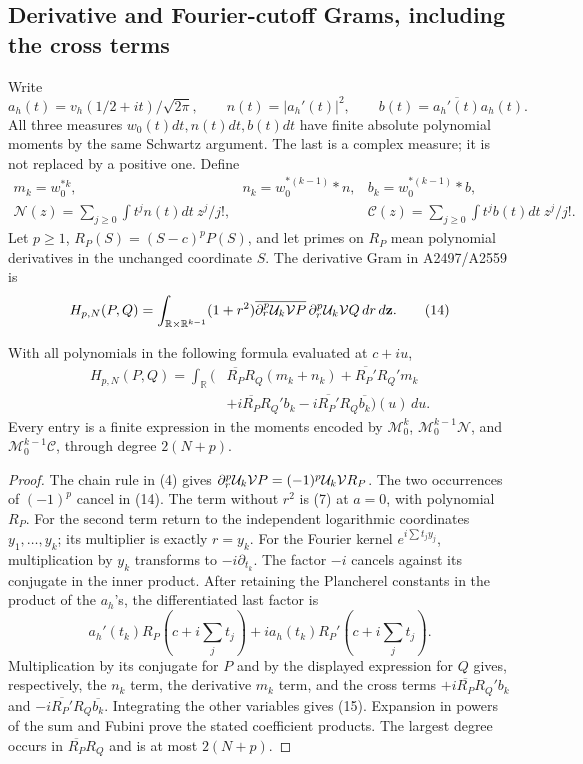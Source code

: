 \subsection{Derivative and Fourier-cutoff Grams, including the cross terms}
Write
\[
 a_h(t)=v_h(1/2+it)/\sqrt{2\pi},\qquad
 n(t)=|a_h'(t)|^2,\qquad
 b(t)=\overline{a_h'(t)}a_h(t).
 \tag{12}
\]
All three measures \(w_0(t)dt,n(t)dt,b(t)dt\) have finite absolute
polynomial moments by the same Schwartz argument. The last is a
complex measure; it is not replaced by a positive one. Define
\[
 \begin{array}{lll}
 m_k=w_0^{*k},&n_k=w_0^{*(k-1)}*n,&b_k=w_0^{*(k-1)}*b,\\
 \mathcal N(z)=\sum_{j\ge0}\int t^jn(t)dt\ z^j/j!,&&
 \mathcal C(z)=\sum_{j\ge0}\int t^jb(t)dt\ z^j/j!.
 \end{array}
 \tag{13}
\]
Let \(p\ge1\), \(R_P(S)=(S-c)^pP(S)\), and let primes on
\(R_P\) mean polynomial derivatives in the unchanged coordinate
\(S\). The derivative Gram in A2497/A2559 is
\[
 H_{p,N}(P,Q)=\int_{\mathbb R\times\mathbb R^{k-1}}
 (1+r^2)\overline{\partial_r^p\mathcal U_k\mathcal V P}\,
                    \partial_r^p\mathcal U_k\mathcal V Q\,dr\,d\mathbf z.
 \tag{14}
\]
\begin{latecontroltheorem}
With all polynomials in the following formula evaluated at \(c+iu\),
\[
 \begin{split}
 H_{p,N}(P,Q)=\int_{\mathbb R}\bigl(&
 \overline{R_P}R_Q(m_k+n_k)
 +\overline{R_P'}R_Q'm_k\\
 &+i\overline{R_P}R_Q'b_k
 -i\overline{R_P'}R_Q\overline{b_k}\bigr)(u)\,du.
 \end{split}
 \tag{15}
\]
Every entry is a finite expression in the moments encoded by
\(\mathcal M_0^k\), \(\mathcal M_0^{k-1}\mathcal N\), and
\(\mathcal M_0^{k-1}\mathcal C\), through degree \(2(N+p)\).
\end{latecontroltheorem}
\begin{proof}
The chain rule in (4) gives
\(\partial_r^p\mathcal U_k\mathcal V P=(-1)^p\mathcal U_k\mathcal V R_P\).
The two occurrences of \((-1)^p\) cancel in (14). The term without
\(r^2\) is (7) at \(a=0\), with polynomial \(R_P\).
For the second term return to the independent logarithmic coordinates
\(y_1,\ldots,y_k\); its multiplier is exactly \(r=y_k\).
For the Fourier kernel \(e^{i\sum t_jy_j}\), multiplication by
\(y_k\) transforms to \(-i\partial_{t_k}\). The factor \(-i\)
cancels against its conjugate in the inner product. After retaining
the Plancherel constants in the product of the \(a_h\)'s, the
differentiated last factor is
\[
 a_h'(t_k)R_P(c+i\textstyle\sum_jt_j)
 +i a_h(t_k)R_P'(c+i\textstyle\sum_jt_j).
\]
Multiplication by its conjugate for \(P\) and by the displayed
expression for \(Q\) gives, respectively, the \(n_k\) term, the
derivative \(m_k\) term, and the cross terms
\(+i\overline{R_P}R_Q'b_k\) and
\(-i\overline{R_P'}R_Q\overline{b_k}\). Integrating the other
variables gives (15). Expansion in powers of the sum and Fubini prove
the stated coefficient products. The largest degree occurs in
\(\overline{R_P}R_Q\) and is at most \(2(N+p)\).
\end{proof}

